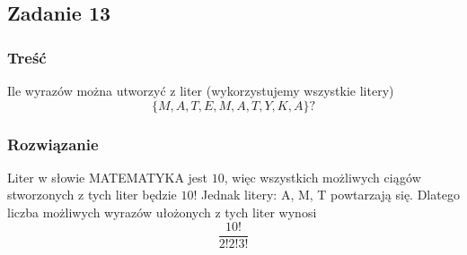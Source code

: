 \subsection{Zadanie 13}

\subsubsection*{Treść}
Ile wyrazów można utworzyć z liter (wykorzystujemy wszystkie litery) 
$$
\{M, A, T, E, M, A, T, Y, K, A\}?
$$

\subsubsection*{Rozwiązanie}
Liter w słowie MATEMATYKA jest $10$, więc wszystkich możliwych ciągów stworzonych z tych liter będzie $10!$
Jednak litery: A, M, T powtarzają się. Dlatego liczba możliwych wyrazów ułożonych z tych liter wynosi
$$
\frac{10!}{2!2!3!}
$$

